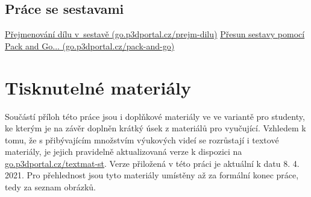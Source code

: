 \section{Práce se sestavami} \label{videa-sestavy}
\href{https://go.p3dportal.cz/prejm-dilu}{Přejmenování dílu v~sestavě (go.p3dportal.cz/prejm-dilu)} \newline
\href{https://go.p3dportal.cz/pack-and-go}{Přesun sestavy pomocí Pack and Go... (go.p3dportal.cz/pack-and-go)} \newline

\chapter{Tisknutelné materiály}
Součástí příloh této práce jsou i doplňkové materiály ve ve variantě pro studenty, ke kterým je na závěr doplněn krátký úsek z materiálů pro vyučující.
Vzhledem k tomu, že s přibývajícím množstvím výukových videí se rozrůstají i textové materiály, je jejich pravidelně aktualizovaná verze k dispozici na \href{https://go.p3dportal.cz/textmat-st}{go.p3dportal.cz/textmat-st}.
Verze přiložená v této práci je aktuální k datu 8. 4. 2021.
Pro přehlednost jsou tyto materiály umístěny až za formální konec práce, tedy za seznam obrázků.

